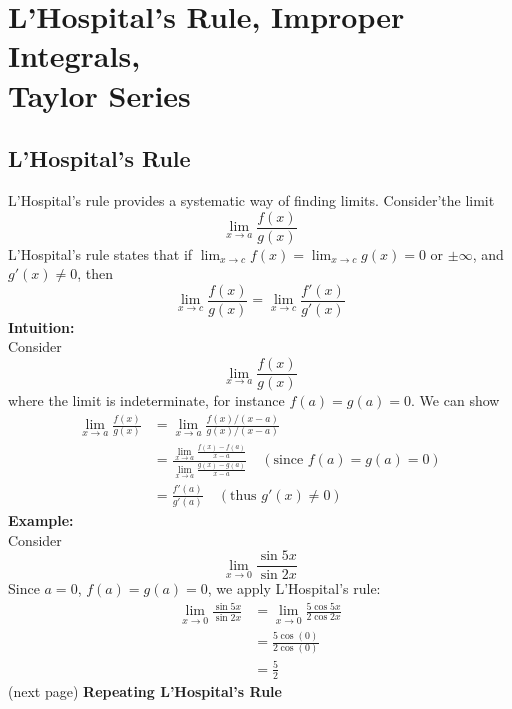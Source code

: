 \documentclass{report}
\begin{document}

\section{L'Hospital's Rule, Improper Integrals,\\ Taylor Series} %

\subsection{L'Hospital's Rule} %
L'Hospital's rule provides a systematic way of finding limits. Consider'the limit
\begin{equation*}
\lim_{x\to a}\frac{f(x)}{g(x)}
\end{equation*}
L'Hospital's rule states that if $\lim_{x\to c}f(x)=\lim_{x\to c}g(x)=0$ or $\pm\infty$, and $g'(x)\neq0$, then 
\begin{equation*}
\lim_{x\to c}\frac{f(x)}{g(x)}=\lim_{x\to c}\frac{f'(x)}{g'(x)}
\end{equation*}
\textbf{Intuition:}\\
Consider
\begin{equation*}
\lim_{x\to a}\frac{f(x)}{g(x)}
\end{equation*}
where the limit is indeterminate, for instance $f(a)=g(a)=0$. We can show
\begin{align*}
\lim_{x\to a}\frac{f(x)}{g(x)}
&=\lim_{x\to a}\frac{f(x)/(x-a)}{g(x)/(x-a)}\\
&=\frac{\lim_{x\to a}\frac{f(x)-f(a)}{x-a}}{\lim_{x\to a}\frac{g(x)-g(a)}{x-a}}
\quad(\text{since }f(a)=g(a)=0)\\
&=\frac{f'(a)}{g'(a)}\quad(\text{thus }g'(x)\neq0)
\end{align*}
\textbf{Example:}\\
Consider
\begin{equation*}
\lim_{x\to0}\frac{\sin5x}{\sin2x}
\end{equation*}
Since $a=0$, $f(a)=g(a)=0$, we apply L'Hospital's rule:
\begin{align*}
\lim_{x\to0}\frac{\sin5x}{\sin2x}&=\lim_{x\to0}\frac{5\cos5x}{2\cos2x}\\
&=\frac{5\cos(0)}{2\cos(0)}\\
&=\frac{5}{2}
\end{align*}
(next page)
\newpage
\noindent\textbf{Repeating L'Hospital's Rule}\\
\end{document}
